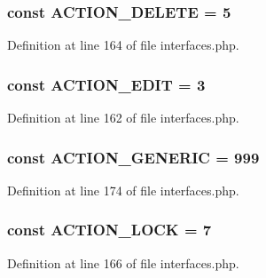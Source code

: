 \hypertarget{interfaceIXLUIHelper_a274e654ac39438f682f6bf1eb450395e}{
\subsubsection[{ACTION\_\-DELETE}]{\setlength{\rightskip}{0pt plus 5cm}const {\bf ACTION\_\-DELETE} = 5}}
\label{interfaceIXLUIHelper_a274e654ac39438f682f6bf1eb450395e}


Definition at line 164 of file interfaces.php.

\hypertarget{interfaceIXLUIHelper_ab9acf282db5918a797e09e1fa108ae9e}{
\subsubsection[{ACTION\_\-EDIT}]{\setlength{\rightskip}{0pt plus 5cm}const {\bf ACTION\_\-EDIT} = 3}}
\label{interfaceIXLUIHelper_ab9acf282db5918a797e09e1fa108ae9e}


Definition at line 162 of file interfaces.php.

\hypertarget{interfaceIXLUIHelper_ab18109cf2120c7f61450d656a4700fff}{
\subsubsection[{ACTION\_\-GENERIC}]{\setlength{\rightskip}{0pt plus 5cm}const {\bf ACTION\_\-GENERIC} = 999}}
\label{interfaceIXLUIHelper_ab18109cf2120c7f61450d656a4700fff}


Definition at line 174 of file interfaces.php.

\hypertarget{interfaceIXLUIHelper_af1b57d540e52e105bcb81d4482546cba}{
\subsubsection[{ACTION\_\-LOCK}]{\setlength{\rightskip}{0pt plus 5cm}const {\bf ACTION\_\-LOCK} = 7}}
\label{interfaceIXLUIHelper_af1b57d540e52e105bcb81d4482546cba}


Definition at line 166 of file interfaces.php.

